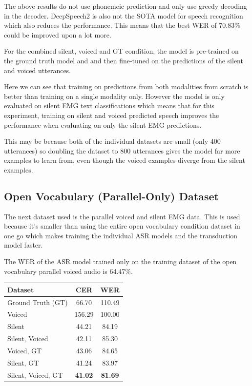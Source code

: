 The above results do not use phonemeic prediction and only use greedy decoding
in the decoder. DeepSpeech2 is also not the SOTA model for speech recognition
which also reduces the performance. This means that the best WER of 70.83\% could
be improved upon a lot more.

For the combined silent, voiced and GT condition, the model is pre-trained on the
ground truth model and and then fine-tuned on the predictions of the
silent and voiced utterances.

Here we can see that training on predictions from both modalities from scratch
is better than training on a single modality only. However the model is only
evaluated on silent EMG text classifications which means that for this experiment,
training on silent and voiced predicted speech improves the performance when
evaluating on only the silent EMG predictions.

This may be because both of the
individual datasets are small (only 400 utterances) so doubling the dataset to
800 utterances gives the model far more examples to learn from, even though the
voiced examples diverge from the silent examples.

\subsection{Open Vocabulary (Parallel-Only) Dataset}

The next dataset used is the parallel voiced and silent EMG data. This is used because
it's smaller than using the entire open vocabulary condition dataset in one go which
makes training the individual ASR models and the transduction model faster.

The WER of the ASR model trained only on the
training dataset of the open vocabulary parallel voiced audio is 64.47\%.

{\small\begin{center}
\begin{tabular} {  l  c  c  }
\hline
\textbf{Dataset} & \textbf{CER} & \textbf{WER} \\
\hline
Ground Truth (GT) & 66.70 & 110.49 \\
Voiced & 156.29 & 100.00 \\
Silent & 44.21 & 84.19 \\
Silent, Voiced & 42.11 & 85.30 \\
Voiced, GT & 43.06 & 84.65 \\
Silent, GT & 41.24 & 83.97 \\
\hline
Silent, Voiced, GT & \textbf{41.02} & \textbf{81.69} \\
\hline
\end{tabular}
\end{center}}

